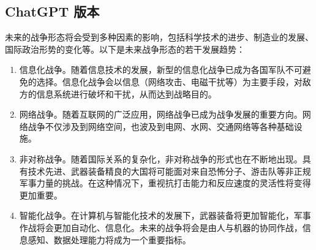 \documentclass[lang=cn,newtx,12pt,scheme=chinese]{elegantbook}
\begin{document}
\subsection{ChatGPT 版本}
未来的战争形态将会受到多种因素的影响，包括科学技术的进步、制造业的发展、国际政治形势的变化等。以下是未来战争形态的若干发展趋势：
\begin{enumerate}
  \item 信息化战争。随着信息技术的发展，新型的信息化战争已成为各国军队不可避免的选择。信息化战争会以信息（网络攻击、电磁干扰等）为主要手段，对敌方的信息系统进行破坏和干扰，从而达到战略目的。
  \item 网络战争。随着互联网的广泛应用，网络战争已成为战争发展的重要方向。网络战争不仅涉及到网络空间，也波及到电网、水网、交通网络等各种基础设施。
  \item 非对称战争。随着国际关系的复杂化，非对称战争的形式也在不断地出现。具有技术先进、武器装备精良的大国将可能面对来自恐怖分子、游击队等非正规军事力量的挑战。在这种情况下，重视抗打击能力和反应速度的灵活性将变得更加重要。
  \item 智能化战争。在计算机与智能化技术的发展下，武器装备将更加智能化，军事作战将会更加自动化、信息化。未来的战争将会是由人与机器的协同作战，信息感知、数据处理能力将成为一个重要指标。
\end{enumerate}
\end{document}
